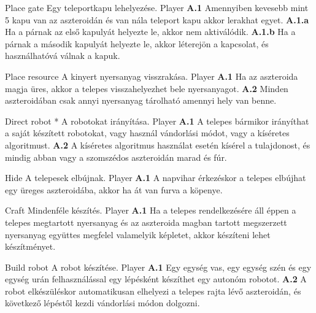 \documentclass[../../projlab]{subfiles}
\begin{document}
\begin{use-case}
	{Place gate}
	{Egy teleportkapu lehelyezése.}
	{Player}
    \textbf{A.1} Amennyiben kevesebb mint 5 kapu van az aszteroidán és van nála teleport kapu akkor lerakhat egyet.
	\newline
	\textbf{A.1.a} Ha a párnak az első kapulyát helyezte le, akkor nem aktiválódik.
	\newline
	\textbf{A.1.b} Ha a párnak a második kapulyát helyezte le, akkor léterejön a kapcsolat, és használhatóvá válnak a kapuk. 
\end{use-case}

\begin{use-case}
	{Place resource}
	{A kinyert nyersanyag visszrakása.}
	{Player}
    \textbf{A.1} Ha az aszteroida magja üres, akkor a telepes visszahelyezhet bele nyersanyagot.
	\newline
	\textbf{A.2} Minden aszteroidában csak annyi nyersanyag tárolható amennyi hely van benne.
\end{use-case}

\begin{use-case}
	{Direct robot *}
	{A robotokat irányítása.}
	{Player}
    \textbf{A.1} A telepes bármikor irányíthat a saját készített robotokat, vagy használ vándorlási módot, vagy a kíséretes algoritmust. 
	\newline
	\textbf{A.2} A kíséretes algoritmus használat esetén kísérel a tulajdonost, és mindig abban vagy a szomszédos aszteroidán marad és fúr.
\end{use-case}

\begin{use-case}
	{Hide}
	{A telepesek elbújnak.}
	{Player}
    \textbf{A.1} A napvihar érkezéskor a telepes elbújhat egy üreges aszteroidába, akkor ha át van furva a köpenye.
\end{use-case}

\begin{use-case}
	{Craft}
	{Mindenféle készítés.}
	{Player}
    \textbf{A.1} Ha a telepes rendelkezésére áll  éppen a telepes megtartott nyersanyag és az aszteroida magban tartott megszerzett nyersanyag együttes megfelel valamelyik képletet, akkor készíteni lehet készítményet. 
\end{use-case}

\begin{use-case}
	{Build robot}
	{A robot készítése.}
	{Player}
    \textbf{A.1} Egy egység vas, egy egység szén és egy egység urán felhasználással egy lépésként készíthet egy autonóm robotot.
	\newline
	\textbf{A.2} A robot elkészüléskor automatikusan elhelyezi a telepes rajta lévő aszteroidán, és következő lépéstől kezdi vándorlási módon dolgozni.
\end{use-case}
\end{document}

